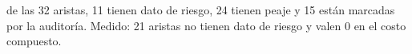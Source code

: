 {de las 32 aristas, 11 tienen dato de riesgo, 24 tienen peaje y 15 están marcadas por la auditoría.}
{Medido: 21 aristas no tienen dato de riesgo y valen 0 en el costo compuesto.}

